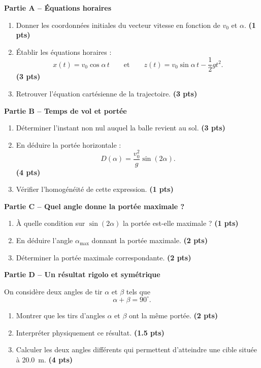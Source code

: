 \documentclass[11pt,a4paper]{article}
\newcommand{\bareme}[1]{\hfill{\color{blue!70!black}\textbf{(#1 pts)}}}
\begin{document}
\medskip

\textbf{Partie A -- Équations horaires}

\begin{enumerate}[label=\textbf{A.\arabic*.}, leftmargin=0.9cm]
    \item Donner les coordonnées initiales du vecteur vitesse en fonction de $v_0$ et $\alpha$. \bareme{1}
    \item Établir les équations horaires :
    \[
    x(t)=v_0\cos\alpha\, t
    \qquad \text{et} \qquad
    z(t)=v_0\sin\alpha\, t-\frac12gt^2.
    \]
    \bareme{3}
    \item Retrouver l’équation cartésienne de la trajectoire. \bareme{3}
\end{enumerate}

\medskip

\textbf{Partie B -- Temps de vol et portée}

\begin{enumerate}[label=\textbf{B.\arabic*.}, leftmargin=0.9cm]
    \item Déterminer l’instant non nul auquel la balle revient au sol. \bareme{3}
    \item En déduire la portée horizontale :
    \[
    D(\alpha)=\frac{v_0^2}{g}\sin(2\alpha).
    \]
    \bareme{4}
    \item Vérifier l’homogénéité de cette expression. \bareme{1}
\end{enumerate}

\medskip

\textbf{Partie C -- Quel angle donne la portée maximale ?}

\begin{enumerate}[label=\textbf{C.\arabic*.}, leftmargin=0.9cm]
    \item À quelle condition sur $\sin(2\alpha)$ la portée est-elle maximale ? \bareme{1}
    \item En déduire l’angle $\alpha_{\max}$ donnant la portée maximale. \bareme{2}
    \item Déterminer la portée maximale correspondante. \bareme{2}
\end{enumerate}

\medskip

\textbf{Partie D -- Un résultat rigolo et symétrique}

On considère deux angles de tir $\alpha$ et $\beta$ tels que
\[
\alpha+\beta=90^\circ.
\]

\begin{enumerate}[label=\textbf{D.\arabic*.}, leftmargin=0.9cm]
    \item Montrer que les tirs d’angles $\alpha$ et $\beta$ ont la même portée. \bareme{2}
    \item Interpréter physiquement ce résultat. \bareme{1.5}
    \item Calculer les deux angles différents qui permettent d’atteindre une cible située à \SI{20.0}{m}. \bareme{4}
\end{enumerate}
\end{document}
